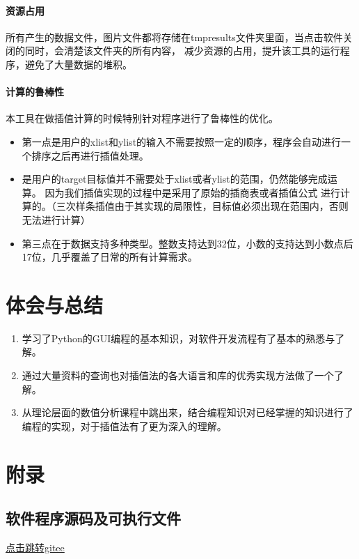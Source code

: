\documentclass[UTF8]{ctexart}
\begin{document}
        \paragraph{资源占用} 所有产生的数据文件，图片文件都将存储在tmpresults文件夹里面，当点击软件关闭的同时，会清楚该文件夹的所有内容，
        减少资源的占用，提升该工具的运行程序，避免了大量数据的堆积。
        \paragraph{计算的鲁棒性} 本工具在做插值计算的时候特别针对程序进行了鲁棒性的优化。
            \begin{itemize}
                \item 第一点是用户的xlist和ylist的输入不需要按照一定的顺序，程序会自动进行一个排序之后再进行插值处理。
                \item 是用户的target目标值并不需要处于xlist或者ylist的范围，仍然能够完成运算。
                        因为我们插值实现的过程中是采用了原始的插商表或者插值公式
                        进行计算的。（三次样条插值由于其实现的局限性，目标值必须出现在范围内，否则无法进行计算）
                \item 第三点在于数据支持多种类型。整数支持达到32位，小数的支持达到小数点后17位，几乎覆盖了日常的所有计算需求。
            \end{itemize}
    \section{体会与总结}
        \begin{enumerate}
            \item 学习了Python的GUI编程的基本知识，对软件开发流程有了基本的熟悉与了解。
            \item 通过大量资料的查询也对插值法的各大语言和库的优秀实现方法做了一个了解。
            \item 从理论层面的数值分析课程中跳出来，结合编程知识对已经掌握的知识进行了编程的实现，对于插值法有了更为深入的理解。
            
        \end{enumerate}
    \section{附录}
        \subsection{软件程序源码及可执行文件}
        \href{https://gitee.com/hxh_create/numerical-analysis-operation}{点击跳转gitee}
    
\end{document}
